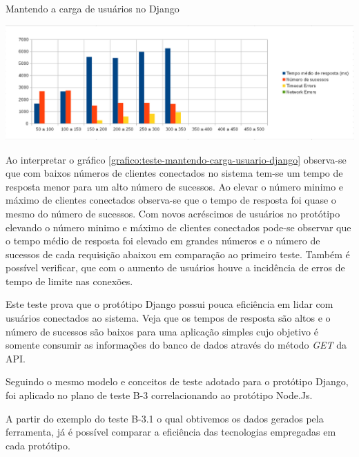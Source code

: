   \begin{grafico}[H]
    \setlength{\abovecaptionskip}{5pt}
    \setlength{\belowcaptionskip}{0pt}
    \label{grafico:teste-mantendo-carga-usuario-django}
    \caption[Mantendo a carga de usuários no Django]
	    {Mantendo a carga de usuários no Django}
    \centering
    \includegraphics[width=.80\textwidth]{imagem/graficos/grafico_django_plano_de_teste_3.png}
    \captionsetup[grafico]{justification=centering}
  \end{grafico}
  
  Ao interpretar o gráfico \ref{grafico:teste-mantendo-carga-usuario-django}  observa-se que com baixos números de clientes 
  conectados no sistema tem-se um tempo de resposta menor para um alto número de sucessos. Ao elevar o número minimo e máximo de 
  clientes conectados observa-se que o tempo de resposta foi quase o mesmo do número de sucessos. Com novos acréscimos de usuários
  no protótipo elevando o número minimo e máximo de clientes conectados pode-se observar que o tempo médio de resposta foi elevado
  em grandes números e o número de sucessos de cada requisição abaixou em comparação ao primeiro teste. Também é possível verificar,
  que com o aumento de usuários houve a incidência de erros de tempo de limite nas conexões.
  
  Este teste prova que o protótipo Django possui pouca eficiência em lidar com usuários conectados ao sistema. Veja que os tempos de 
  resposta são altos e o número de sucessos são baixos para uma aplicação simples cujo objetivo é somente consumir as informações do banco de 
  dados através do método \textit{GET} da API.
  
  Seguindo o mesmo modelo e conceitos de teste adotado para o protótipo Django, foi aplicado no plano de teste 
  B-3 correlacionando ao protótipo Node.Js. 
  
  A partir do exemplo do teste B-3.1 o qual obtivemos os dados gerados pela ferramenta, já é possível comparar a eficiência das 
  tecnologias empregadas em cada protótipo.
  
